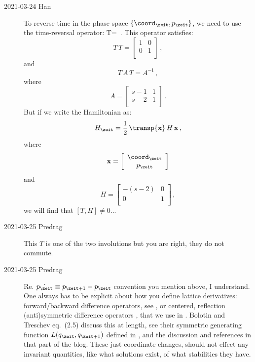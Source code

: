 \begin{description}
    \item[2021-03-24 Han]
To reverse time in the phase space $\{\coord_{\zeit}, p_\zeit\}$, we need
to use the time-reversal operator:
\beq
T=
\left[
\begin{array}{cc}
 1 & 0 \\
 2-s & -1 \\
\end{array}
\right]
\,.
This operator satisfies:
\[
T\,T=
 \left[
\begin{array}{cc}
 1 & 0 \\
 0 & 1 \\
\end{array}
\right]
\,,
\]
and
\[
T\,A\,T=A^{-1} \,,
\]
where
\[
A=
 \left[
\begin{array}{cc}
 s-1 & 1 \\
 s-2 & 1 \\
\end{array}
\right]
\,.
\]
But if we write the Hamiltonian as:
\[
H_\zeit
=\frac{1}{2}\,\transp{\bf x}\,H\,{\bf x}
\,,
\]
where
\[
{\bf x}
=
 \left[
\begin{array}{c}
 \coord_\zeit \\
 p_\zeit \\
\end{array}
\right]
\]
and
\[
H=
 \left[
\begin{array}{cc}
 -(s-2) & 0 \\
 0 & 1 \\
\end{array}
\right]\,,
\]
we will find that $[T,H]\neq0$...

    \item[2021-03-25 Predrag]
This $T$  is one of the two involutions
but you are right, they do not commute.


    \item[2021-03-25 Predrag]
Re. $\dot{p_\zeit} \equiv p_{\zeit+1} - p_\zeit$ convention you mention
above, I understand. One always has to be explicit about how you define
lattice derivatives: forward/backward difference operators, see
,  or centered, reflection
(anti)symmetric difference operators , that we use in
. Bolotin and Treschev eq.~(2.5)
discuss this at length, see their symmetric generating function
$L(q_{\zeit},q_{\zeit+1})$ defined in , and the
discussion and references in that part of the blog.
These just coordinate changes, should not effect any invariant
quantities, like what solutions exist, of what stabilities they have.


\end{description}
